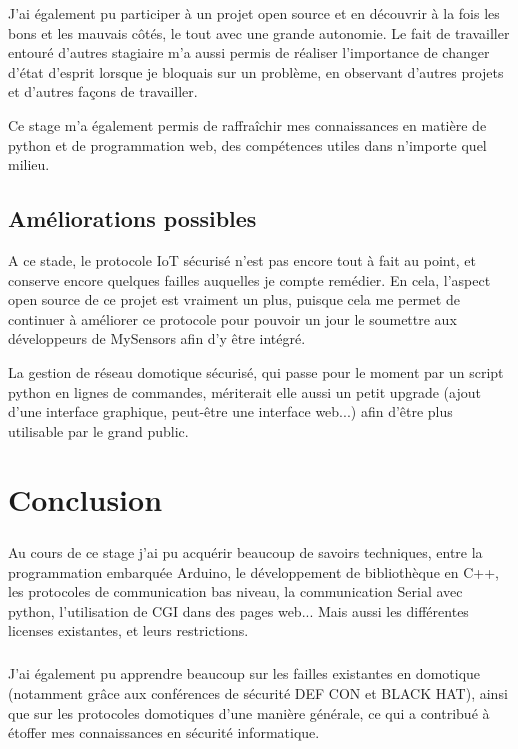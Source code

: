 \documentclass[12 pt]{report}
\begin{document}
J'ai également pu participer à un projet open source et en découvrir à la fois les bons et les mauvais côtés, le tout avec une grande autonomie. Le fait de travailler entouré d'autres stagiaire m'a aussi permis de réaliser l'importance de changer d'état d'esprit lorsque je bloquais sur un problème, en observant d'autres projets et d'autres façons de travailler.

Ce stage m'a également permis de raffraîchir mes connaissances en matière de python et de programmation web, des compétences utiles dans n'importe quel milieu.

\section{Améliorations possibles}
A ce stade, le protocole IoT sécurisé n'est pas encore tout à fait au point, et conserve encore quelques failles auquelles je compte remédier. En cela, l'aspect open source de ce projet est vraiment un plus, puisque cela me permet de continuer à améliorer ce protocole pour pouvoir un jour le soumettre aux développeurs de MySensors afin d'y être intégré.

La gestion de réseau domotique sécurisé, qui passe pour le moment par un script python en lignes de commandes, mériterait elle aussi un petit upgrade (ajout d'une interface graphique, peut-être une interface web...) afin d'être plus utilisable par le grand public.
\chapter{Conclusion}
\paragraph{} Au cours de ce stage j'ai pu acquérir beaucoup de savoirs techniques, entre la programmation embarquée Arduino, le développement de bibliothèque en C++, les protocoles de communication bas niveau, la communication Serial avec python, l'utilisation de CGI dans des pages web... Mais aussi les différentes licenses existantes, et leurs restrictions.

\paragraph{} J'ai également pu apprendre beaucoup sur les failles existantes en domotique (notamment grâce aux conférences de sécurité DEF CON et BLACK HAT), ainsi que sur les protocoles domotiques d'une manière générale, ce qui a contribué à étoffer mes connaissances en sécurité informatique.
\end{document}
